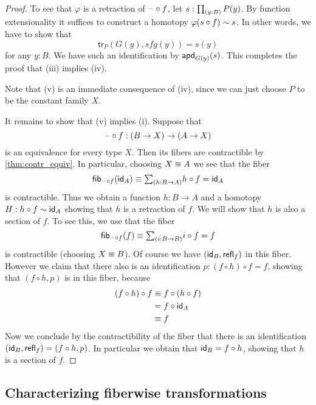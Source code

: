 \begin{proof}
To see that $\varphi$ is a retraction of $\blank\circ f$, let $s:\prd{y:B}P(y)$. By function extensionality it suffices to construct a homotopy $\varphi(s\circ f)\htpy s$. In other words, we have to show that
\begin{equation*}
\mathsf{tr}_P(G(y),sfg(y))=s(y)
\end{equation*}
for any $y:B$. We have such an identification by $\apd{G(y)}{s}$. This completes the proof that (iii) implies (iv).

Note that (v) is an immediate consequence of (iv), since we can just choose $P$ to be the constant family $X$.

It remains to show that (v) implies (i). Suppose that
\begin{equation*}
\blank\circ f:(B\to X)\to (A\to X)
\end{equation*}
is an equivalence for every type $X$. Then its fibers are contractible by \cref{thm:contr_equiv}. In particular, choosing $X\jdeq A$ we see that the fiber
\begin{equation*}
\fib{\blank\circ f}{\idfunc[A]}\jdeq \sm{h:B\to A}h\circ f=\idfunc[A]
\end{equation*}
is contractible. Thus we obtain a function $h:B\to A$ and a homotopy $H:h\circ f\htpy\idfunc[A]$ showing that $h$ is a retraction of $f$. We will show that $h$ is also a section of $f$. To see this, we use that the fiber
\begin{equation*}
\fib{\blank\circ f}{f}\jdeq \sm{i:B\to B} i\circ f=f
\end{equation*}
is contractible (choosing $X\jdeq B$). 
Of course we have $(\idfunc[B],\refl{f})$ in this fiber. However we claim that there also is an identification $p:(f\circ h)\circ f=f$, showing that $(f\circ h,p)$ is in this fiber, because
\begin{align*}
(f\circ h)\circ f & \jdeq f\circ (h\circ f) \\
& = f\circ \idfunc[A] \\
& \jdeq f
\end{align*}
Now we conclude by the contractibility of the fiber that there is an identification $(\idfunc[B],\refl{f})=(f\circ h,p)$. In particular we obtain that $\idfunc[B]=f\circ h$, showing that $h$ is a section of $f$.
\end{proof}

\subsection{Characterizing fiberwise transformations}

